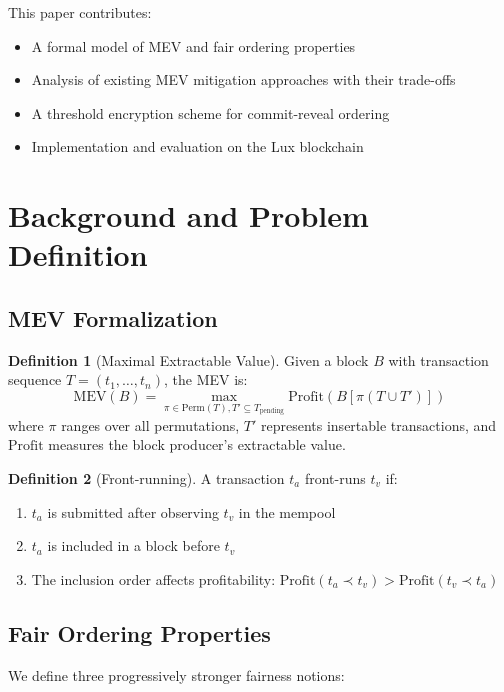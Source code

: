 \documentclass[11pt,a4paper]{article}
\theoremstyle{definition}
\newtheorem{definition}{Definition}
\begin{document}
This paper contributes:
\begin{itemize}
    \item A formal model of MEV and fair ordering properties
    \item Analysis of existing MEV mitigation approaches with their trade-offs
    \item A threshold encryption scheme for commit-reveal ordering
    \item Implementation and evaluation on the Lux blockchain
\end{itemize}

\section{Background and Problem Definition}

\subsection{MEV Formalization}

\begin{definition}[Maximal Extractable Value]
Given a block $B$ with transaction sequence $T = (t_1, \ldots, t_n)$, the MEV is:
\[
\text{MEV}(B) = \max_{\pi \in \text{Perm}(T), T' \subseteq T_{\text{pending}}} \text{Profit}(B[\pi(T \cup T')])
\]
where $\pi$ ranges over all permutations, $T'$ represents insertable transactions, and $\text{Profit}$ measures the block producer's extractable value.
\end{definition}

\begin{definition}[Front-running]
A transaction $t_a$ front-runs $t_v$ if:
\begin{enumerate}
    \item $t_a$ is submitted after observing $t_v$ in the mempool
    \item $t_a$ is included in a block before $t_v$
    \item The inclusion order affects profitability: $\text{Profit}(t_a \prec t_v) > \text{Profit}(t_v \prec t_a)$
\end{enumerate}
\end{definition}

\subsection{Fair Ordering Properties}

We define three progressively stronger fairness notions:
\end{document}
